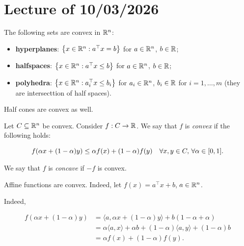 \chapter{Lecture \thechapter{} of 10/03/2026}

\begin{example}

    The following sets are convex in ${\mathbb{R}^n}$:

    \begin{itemize}
        \item \textbf{hyperplanes}: $\left\{ x \in {\mathbb{R}^n} : a^\top x = b \right\}$ for $a \in {\mathbb{R}^n}$, $b \in \mathbb{R}$;
        \item \textbf{halfspaces}: $\left\{ x \in {\mathbb{R}^n} : a^\top x \le b \right\}$ for $a \in {\mathbb{R}^n}$, $b \in \mathbb{R}$;
        \item \textbf{polyhedra}: $\left\{ x \in {\mathbb{R}^n} : a_i^\top x \le b_i \right\}$ for $a_i \in {\mathbb{R}^n}$, $b_i \in \mathbb{R}$ for $i = 1,\dots, m$ (they are intersecttion of half spaces).
    \end{itemize}

    Half cones are convex as well.
    
\end{example}

\begin{definition}
    
    Let $C \subseteq {\mathbb{R}^n}$ be convex. Consider $f : C \to \mathbb{R}$. We say that $f$ is \emph{convex} if the following holds:

    \[ f(\alpha x + (1-\alpha)y) \le \alpha f(x) + (1-\alpha)f(y) \quad \forall x,y \in C, \, \forall \alpha \in [0,1].\]

    We say that $f$ is \emph{concave} if $-f$ is convex.

\end{definition}

\begin{example}
    
    Affine functions are convex. Indeed, let $f(x) = a^\top x + b$, $a \in {\mathbb{R}^n}$. 

    Indeed,

    \begin{align*}
        f(\alpha x + (1-\alpha)y) &= \langle a, \alpha x + (1-\alpha)y \rangle + b(1 - \alpha + \alpha) \\
        &= \alpha \langle a, x \rangle + \alpha b + (1-\alpha) \langle a,y\rangle + (1-\alpha)b \\ 
        &= \alpha f(x) + (1-\alpha)f(y).
    \end{align*}

\end{example}

